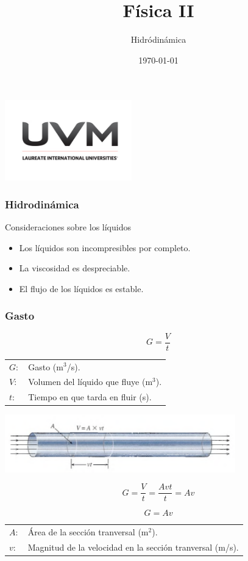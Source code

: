 \documentclass[handout]{beamer}
\title{Física II}
\author{Hidródinámica}
\institute[UVM]{4\textdegree \hspace{2pt} cuatrimestre.}
\date{\today}
\begin{document}
\begin{frame}[noframenumbering]
  \titlepage
  \begin{center}
    \includegraphics[width=5.5cm]{uvm1}    
  \end{center}  
\end{frame}


\begin{frame}
  \frametitle{Hidrodinámica}
  \begin{block}{Consideraciones sobre los líquidos}
    \begin{itemize}
    \item Los líquidos son incompresibles por completo.
    \item La viscosidad es despreciable.
    \item El flujo de los líquidos es estable.
    \end{itemize}
  \end{block}
\end{frame}

\begin{frame}[allowframebreaks,t]
  \frametitle{Gasto}
  
  {\huge \[G= \frac{V}{t}\]}
  
  \begin{tabular}{ll}
    $G:$ & Gasto (m$^3$/s).  \\ 
    $V:$ & Volumen del líquido que fluye (m$^3$). \\ 
    $t:$ & Tiempo en que tarda en fluir (s). \\
  \end{tabular}
  \begin{center}
    \includegraphics[width=10cm]{continuidad}
  \end{center}
  \[
  G = \frac{V}{t} = \frac{Avt}{t} = Av
  \]

  {\huge \[G = Av\]}

  \begin{tabular}{ll}
    $A:$ & Área de la sección tranversal (m$^2$).  \\ 
    $v:$ & Magnitud de la velocidad en la sección tranversal (m/s). \\
  \end{tabular}
  
\end{frame}
\end{document}
